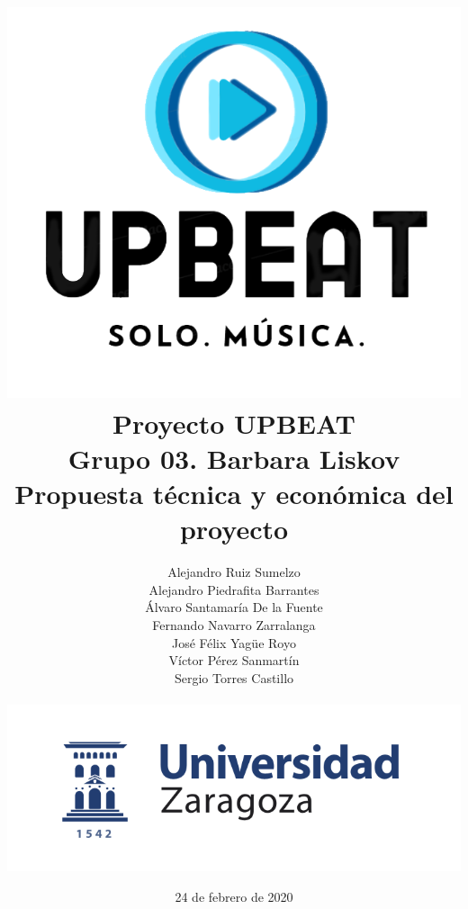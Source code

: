 \documentclass{article}
\begin{document}
\title{\includegraphics[scale=0.65]{logoDefinitivo1.png} \\ \textbf{Proyecto UPBEAT} \\ \textbf{Grupo 03. Barbara Liskov}\\Propuesta técnica y económica del proyecto \vspace{0.1cm} \\}


\author{Alejandro Ruiz Sumelzo\\
Alejandro Piedrafita Barrantes\\
Álvaro Santamaría De la Fuente\\
Fernando Navarro Zarralanga\\
José Félix Yagüe Royo\\
Víctor Pérez Sanmartín\\
Sergio Torres Castillo \vspace{0.25cm}
\\\\
\includegraphics[scale=0.5]{logoUZ.png}\\
}
\date{24 de febrero de 2020}
\end{document}
